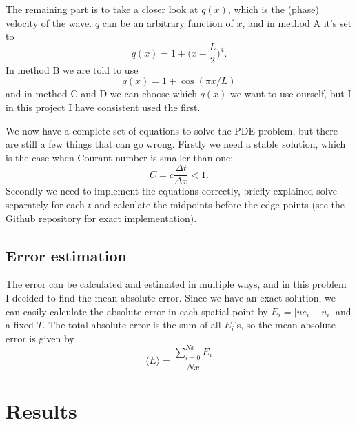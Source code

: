\documentclass[norsk,a4paper,12pt]{article}
\begin{document}
The remaining part is to take a closer look at $q(x)$, which is the (phase) velocity of the wave. $q$ can be an arbitrary function of $x$, and in method A it's set to
\begin{equation}
q(x)=1+\bigg(x-\frac{L}{2}\bigg)^4.
\end{equation}
In method B we are told to use
\begin{equation}
q(x)=1+\cos(\pi x/L)
\end{equation}
and in method C and D we can choose which $q(x)$ we want to use ourself, but I in this project I have consistent used the first. 

We now have a complete set of equations to solve the PDE problem, but there are still a few things that can go wrong. Firstly we need a stable solution, which is the case when Courant number is smaller than one:
\begin{equation}
C=c\frac{\Delta t}{\Delta x}<1.
\end{equation}
Secondly we need to implement the equations correctly, briefly explained solve separately for each $t$ and calculate the midpoints before the edge points (see the Github repository for exact implementation).

\subsection{Error estimation}
The error can be calculated and estimated in multiple ways, and in this problem I decided to find the mean absolute error. Since we have an exact solution, we can easily calculate the absolute error in each spatial point by $E_i=|ue_i-u_i|$ and a fixed $T$. The total absolute error is the sum of all $E_i$'s, so the mean absolute error is given by
\begin{equation}
\langle E\rangle = \frac{\sum_{i=0}^{Nx} E_i}{Nx}
\end{equation}

\section{Results}
\end{document}
